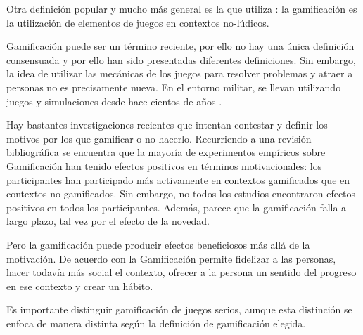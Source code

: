 Otra definición popular y mucho más general es la que utiliza  \cite{kwerb-WhatIs}: la gamificación es la utilización de elementos de juegos en contextos no-lúdicos.



Gamificación puede ser un término reciente, por ello no hay una única definición consensuada y por ello han sido presentadas diferentes definiciones.
%
Sin embargo, la idea de utilizar las mecánicas de los juegos para resolver problemas y atraer a personas no es precisamente nueva. 
%
En el entorno militar, se llevan utilizando juegos y simulaciones desde hace cientos  de años \citep{GamificationDefII}.

%
%



Hay bastantes investigaciones recientes que intentan contestar y definir los motivos por los que gamificar o no hacerlo.
%
Recurriendo a una revisión bibliográfica \cite{EmpiricalGamification} se encuentra que la mayoría de experimentos empíricos sobre Gamificación han tenido efectos positivos en términos motivacionales: los participantes han participado más activamente en contextos gamificados que en contextos no gamificados.
%
Sin embargo, no todos los estudios encontraron efectos positivos en todos los participantes.
%
Además, parece que la gamificación falla a largo plazo, tal vez por el efecto de la novedad. 

Pero la gamificación puede producir efectos beneficiosos más allá de la motivación.
% 
De acuerdo con  \cite{kwerb-WhyGamify} la Gamificación permite fidelizar a las personas, hacer todavía más social el contexto, ofrecer a la persona un sentido del progreso en ese contexto y crear un hábito.





Es importante distinguir gamificación de juegos serios, aunque esta distinción se enfoca de manera distinta según la definición de gamificación elegida.


